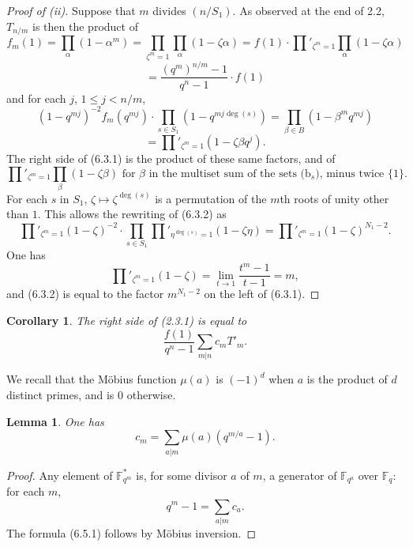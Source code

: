 \documentclass[11pt,a4paper]{article}
\theoremstyle{plain}
\newtheorem{lemma}[theorem]{Lemma}
\newtheorem{corollary}[theorem]{Corollary}
\theoremstyle{definition}
\newcommand{\Fq}{\mathbb{F}_q}
\newcommand{\F}{\mathbb{F}}
\begin{document}
\begin{proof}[Proof of (ii)]
Suppose that $m$ divides $(n/S_1)$. As observed at the end of 2.2, $T_{n/m}$ is then the product of
\[
f_m(1) = \prod_\alpha (1 - \alpha^m) = \prod_{\zeta^m=1} \prod_\alpha (1 - \zeta \alpha) = f(1) \cdot \prod'_{\zeta^m=1} \prod_\alpha (1 - \zeta \alpha)
\]
\[
= \frac{(q^m)^{n/m} - 1}{q^n - 1} \cdot f(1)
\]
and for each $j$, $1 \leq j < n/m$,
\[
(1 - q^{mj})^{-2} f_m(q^{mj}) \cdot \prod_{s \in S_1} (1 - q^{mj\deg(s)}) = \prod_{\beta \in B} (1 - \beta^m q^{mj})
\]
\[
= \prod'_{\zeta^m=1} (1 - \zeta \beta q^j).
\]
The right side of (6.3.1) is the product of these same factors, and of
\begin{equation}
\prod'_{\zeta^m=1} \prod_{\beta} (1 - \zeta \beta) \text{ for $\beta$ in the multiset sum of the sets (b$_s$), minus twice $\{1\}$.} \tag{6.3.2}
\end{equation}
For each $s$ in $S_1$, $\zeta \mapsto \zeta^{\deg(s)}$ is a permutation of the $m$th roots of unity other than $1$. This allows the rewriting of (6.3.2) as
\[
\prod'_{\zeta^m=1} (1 - \zeta)^{-2} \cdot \prod_{s \in S_1} \prod'_{\eta^{\deg(s)}=1} (1 - \zeta \eta) = \prod'_{\zeta^m=1} (1 - \zeta)^{N_1 - 2}.
\]
One has
\[
\prod'_{\zeta^m=1} (1 - \zeta) = \lim_{t \to 1} \frac{t^m - 1}{t - 1} = m,
\]
and (6.3.2) is equal to the factor $m^{N_1-2}$ on the left of (6.3.1).
\end{proof}

\begin{corollary}
The right side of (2.3.1) is equal to
\begin{equation}
\frac{f(1)}{q^n - 1} \sum_{m | n} c_m T'_m. \tag{6.4.1}
\end{equation}
\end{corollary}

We recall that the M\"obius function $\mu(a)$ is $(-1)^d$ when $a$ is the product of $d$ distinct primes, and is $0$ otherwise.

\begin{lemma}
One has
\begin{equation}
c_m = \sum_{a | m} \mu(a) (q^{m/a} - 1). \tag{6.5.1}
\end{equation}
\end{lemma}

\begin{proof}
Any element of $\F_{q^m}^*$ is, for some divisor $a$ of $m$, a generator of $\F_{q^a}$ over $\Fq$: for each $m$,
\[
q^m - 1 = \sum_{a | m} c_a.
\]
The formula (6.5.1) follows by M\"obius inversion.
\end{proof}
\end{document}
